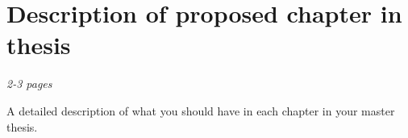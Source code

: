 \chapter{Description of proposed chapter in thesis}
\label{ch:discription}
\textit{2-3 pages}

A detailed description of what you should have in each
chapter in your master thesis.